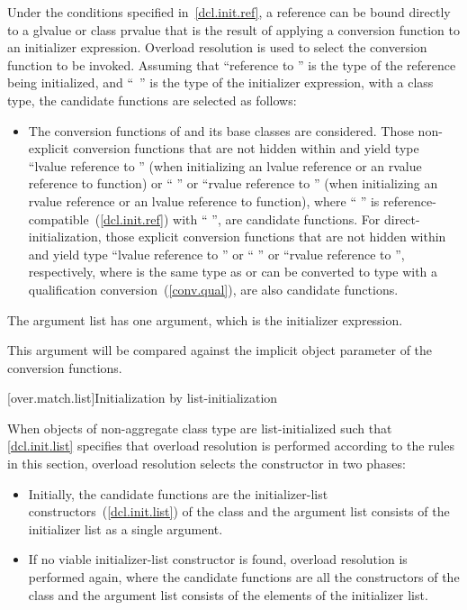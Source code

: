 \pnum
Under the conditions specified in~\ref{dcl.init.ref}, a reference can be bound directly
to a glvalue or class prvalue that is the result of applying a conversion
function to an initializer expression.
Overload resolution is used to select the
conversion function to be invoked.
Assuming that ``reference to  '' is the
type of the reference being initialized, and
``\cv{}~'' is the type
of the initializer expression, with
a class type,
the candidate functions are selected as follows:
\begin{itemize}
\item
The conversion functions of
and its base classes are considered.
Those non-explicit conversion functions that are not hidden within
and yield type ``lvalue reference to  ''
(when initializing an lvalue reference or an rvalue reference to function) or
`` ''
or ``rvalue reference to  '' (when initializing an
rvalue reference or an lvalue reference to function),
where `` '' is reference-compatible~(\ref{dcl.init.ref})
with `` '',
are candidate functions. For direct-initialization, those explicit
conversion functions that are not hidden within  and yield
type ``lvalue reference to  '' or ``
'' or ``rvalue reference to  '',
respectively, where  is the same type as  or can be
converted to type  with a qualification
conversion~(\ref{conv.qual}), are also candidate functions.

\end{itemize}

\pnum
The argument list has one argument, which is the initializer expression.
\begin{note}
This argument will be compared against
the implicit object parameter of the conversion functions.
\end{note}

[over.match.list]{Initialization by list-initialization}%

\pnum
When objects of non-aggregate class type  are
list-initialized such that \ref{dcl.init.list} specifies that overload resolution
is performed according to the rules in this section, overload resolution selects the
constructor in two phases:

\begin{itemize}
\item
Initially, the candidate functions are the initializer-list constructors~(\ref{dcl.init.list})
of the class  and
the argument list consists of the initializer list as a single argument.

\item
If no viable initializer-list constructor is found, overload resolution is
performed again, where the candidate functions are all the constructors of
the class  and
the argument list consists of the elements of the initializer list.
\end{itemize}

